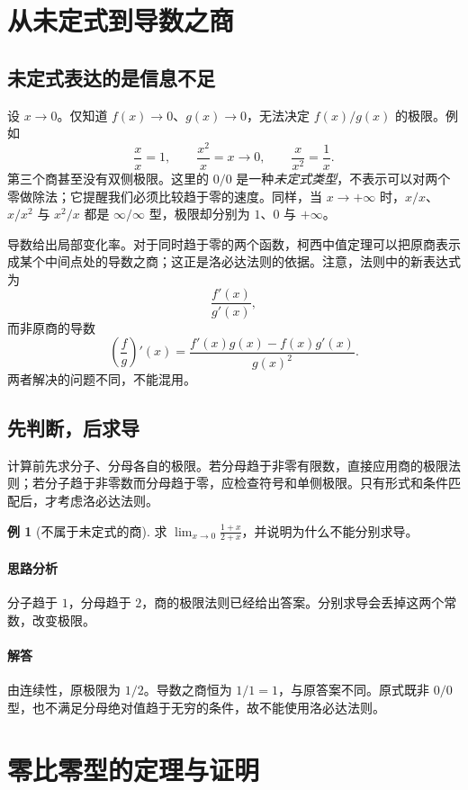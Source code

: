 \documentclass[UTF8,fontset=fandol,12pt,oneside,openany]{ctexrep}
\theoremstyle{definition}
\newtheorem{example}{例}[chapter]
\begin{document}
\section{从未定式到导数之商}
\label{lec:07:indeterminate}

\subsection{未定式表达的是信息不足}

设 $x\to0$。仅知道 $f(x)\to0$、$g(x)\to0$，无法决定 $f(x)/g(x)$ 的极限。例如
\[
\frac{x}{x}=1,\qquad
\frac{x^2}{x}=x\to0,\qquad
\frac{x}{x^2}=\frac1x.
\]
第三个商甚至没有双侧极限。这里的 $0/0$ 是一种\emph{未定式类型}，不表示可以对两个零做除法；它提醒我们必须比较趋于零的速度。同样，当 $x\to+\infty$ 时，$x/x$、$x/x^2$ 与 $x^2/x$ 都是 $\infty/\infty$ 型，极限却分别为 $1$、$0$ 与 $+\infty$。

导数给出局部变化率。对于同时趋于零的两个函数，柯西中值定理可以把原商表示成某个中间点处的导数之商；这正是洛必达法则的依据。注意，法则中的新表达式为
\[
\frac{f'(x)}{g'(x)},
\]
而非原商的导数
\[
\left(\frac fg\right)'(x)
=\frac{f'(x)g(x)-f(x)g'(x)}{g(x)^2}.
\]
两者解决的问题不同，不能混用。

\subsection{先判断，后求导}

计算前先求分子、分母各自的极限。若分母趋于非零有限数，直接应用商的极限法则；若分子趋于非零数而分母趋于零，应检查符号和单侧极限。只有形式和条件匹配后，才考虑洛必达法则。

\begin{example}[不属于未定式的商]
求 $\displaystyle\lim_{x\to0}\frac{1+x}{2+x}$，并说明为什么不能分别求导。
\end{example}
\paragraph{思路分析}
分子趋于 $1$，分母趋于 $2$，商的极限法则已经给出答案。分别求导会丢掉这两个常数，改变极限。
\paragraph{解答}
由连续性，原极限为 $1/2$。导数之商恒为 $1/1=1$，与原答案不同。原式既非 $0/0$ 型，也不满足分母绝对值趋于无穷的条件，故不能使用洛必达法则。

\section{零比零型的定理与证明}
\label{lec:07:zero}
\end{document}
